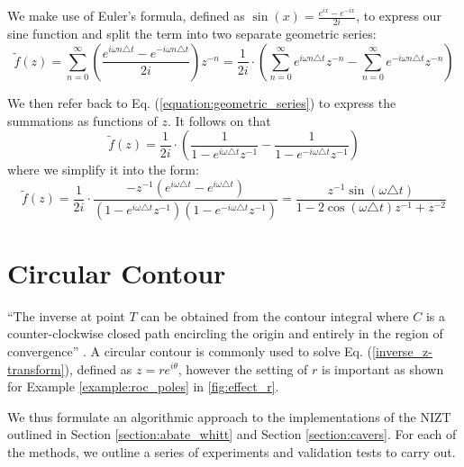 \documentclass[a4paper]{report}
\begin{document}
We make use of Euler's formula, defined as $\sin(x) = \frac{e^{ix} - e^{-ix}}{2i}$, to express our sine function and split the term into two separate geometric series:
\begin{equation}
	\tilde{f}(z) = \sum^{\infty}_{n = 0} \left( \frac{e^{i\omega n\triangle t} - e^{-i\omega n\triangle t}}{2i} \right) z^{-n} = \frac{1}{2i}\cdot\left( \sum^{\infty}_{n = 0} e^{i\omega n\triangle t} z^{-n} - \sum^{\infty}_{n = 0} e^{-i\omega n\triangle t}z^{-n}\right)
\end{equation}
 
 We then refer back to Eq. (\ref{equation:geometric_series}) to express the summations as functions of $z$. It follows on that
\begin{equation}
	\tilde{f}(z) = \frac{1}{2i}\cdot \left( \frac{1}{1 - e^{i\omega \triangle t}z^{-1}} - \frac{1}{1 - e^{-i\omega \triangle t}z^{-1}} \right)
\end{equation}
where we simplify it into the form:
\begin{equation}
\tilde{f}(z) = \frac{1}{2i} \cdot \frac{ -z^{-1}(e^{i\omega \triangle t} - e^{i\omega \triangle t})}{(1 - e^{i\omega \triangle t}z^{-1})(1 - e^{-i\omega \triangle t}z^{-1})} = \frac{z^{-1}\sin(\omega \triangle t)}{1 - 2\cos(\omega\triangle t)z^{-1} + z^{-2}}
\end{equation}

\section{Circular Contour}\label{section:circular_contour}
``The inverse at point $T$ can be obtained from the contour integral where $C$ is a counter-clockwise closed path encircling the origin and entirely in the region of convergence'' \citep{horvath2020numerical}. A circular contour is commonly used to solve Eq. (\ref{inverse_z-transform}), defined as $z = re^{i\theta}$, however the setting of $r$ is important as shown for Example \ref{example:roc_poles} in \autoref{fig:effect_r}.

We thus formulate an algorithmic approach to the implementations of the NIZT outlined in Section \ref{section:abate_whitt} and Section \ref{section:cavers}. For each of the methods, we outline a series of experiments and validation tests to carry out.
\end{document}
